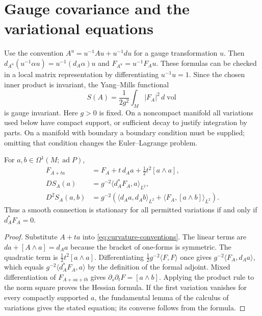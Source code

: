 \section{Gauge covariance and the variational equations}

Use the convention
$A^u=u^{-1}Au+u^{-1}du$ for a gauge transformation $u$.
Then $d_{A^u}(u^{-1}\alpha u)=u^{-1}(d_A\alpha)u$ and
$F_{A^u}=u^{-1}F_Au$.  These formulas can be checked in a local matrix
representation by differentiating $u^{-1}u=1$.  Since the chosen inner
product is invariant, the Yang--Mills functional
\begin{equation}
 S(A)=\frac{1}{2g^2}\int_M |F_A|^2\,d\operatorname{vol}
 \label{eq:yang-mills-action}
\end{equation}
is gauge invariant.  Here $g>0$ is fixed.  On a noncompact manifold all
variations used below have compact support, or sufficient decay to justify
integration by parts.  On a manifold with boundary a boundary condition must
be supplied; omitting that condition changes the Euler--Lagrange problem.

\begin{proposition}
For $a,b\in\Omega^1(M;\operatorname{ad}P)$,
\begin{align}
 F_{A+ta}&=F_A+t\,d_Aa+\tfrac12t^2[a\wedge a],\label{eq:curvature-variation}\\
 DS_A(a)&=g^{-2}\langle d_A^*F_A,a\rangle_{L^2},\label{eq:ym-first}\\
 D^2S_A(a,b)&=g^{-2}\left(
 \langle d_Aa,d_Ab\rangle_{L^2}
 +\langle F_A,[a\wedge b]\rangle_{L^2}\right).
 \label{eq:ym-second}
\end{align}
Thus a smooth connection is stationary for all permitted variations if and
only if $d_A^*F_A=0$.
\end{proposition}

\begin{proof}
Substitute $A+ta$ into \eqref{eq:curvature-conventions}.  The linear terms
are $da+[A\wedge a]=d_Aa$ because the bracket of one-forms is symmetric.
The quadratic term is $\frac12t^2[a\wedge a]$.  Differentiating
$\frac12g^{-2}\langle F,F\rangle$ once gives
$g^{-2}\langle F_A,d_Aa\rangle$, which equals
$g^{-2}\langle d_A^*F_A,a\rangle$ by the definition of the formal
adjoint.  Mixed differentiation of $F_{A+sa+tb}$ gives
$\partial_s\partial_tF=[a\wedge b]$.  Applying the product rule to the
norm square proves the Hessian formula.  If the first variation vanishes
for every compactly supported $a$, the fundamental lemma of the calculus of
variations gives the stated equation; its converse follows from the formula.
\end{proof}

